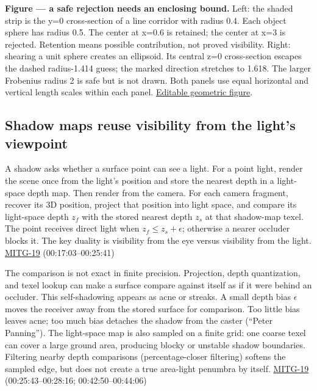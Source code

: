 \textbf{Figure --- a safe rejection needs an enclosing bound.} Left: the shaded strip is the y=0 cross-section of a line corridor with radius 0.4. Each object sphere has radius 0.5. The center at x=0.6 is retained; the center at x=3 is rejected. Retention means possible contribution, not proved visibility. Right: shearing a unit sphere creates an ellipsoid. Its central z=0 cross-section escapes the dashed radius-1.414 guess; the marked direction stretches to 1.618. The larger Frobenius radius 2 is safe but is not drawn. Both panels use equal horizontal and vertical length scales within each panel. \href{../current/Assets/Print/016860dc0184c06f711840f56b538b20ca1c1da2056933afcee968eb701078d3.svg}{Editable geometric figure}.

\subsection{Shadow maps reuse visibility from the light's viewpoint}\label{04-visual-computing-ii-ch028-shadow-maps-reuse-visibility-from-the-lights-viewpoint}

A shadow asks whether a surface point can see a light. For a point light, render the scene once from the light's position and store the nearest depth in a light-space depth map. Then render from the camera. For each camera fragment, recover its 3D position, project that position into light space, and compare its light-space depth \(z_f\) with the stored nearest depth \(z_s\) at that shadow-map texel. The point receives direct light when \(z_f\le z_s+\epsilon\); otherwise a nearer occluder blocks it. The key duality is visibility from the eye versus visibility from the light. \hyperref[04-visual-computing-ii-ch036-mitg-19---shadow-maps]{MITG-19} (00:17:03--00:25:41)

The comparison is not exact in finite precision. Projection, depth quantization, and texel lookup can make a surface compare against itself as if it were behind an occluder. This self-shadowing appears as acne or streaks. A small depth bias \(\epsilon\) moves the receiver away from the stored surface for comparison. Too little bias leaves acne; too much bias detaches the shadow from the caster (``Peter Panning''). The light-space map is also sampled on a finite grid: one coarse texel can cover a large ground area, producing blocky or unstable shadow boundaries. Filtering nearby depth comparisons (percentage-closer filtering) softens the sampled edge, but does not create a true area-light penumbra by itself. \hyperref[04-visual-computing-ii-ch036-mitg-19---shadow-maps]{MITG-19} (00:25:43--00:28:16; 00:42:50--00:44:06)

